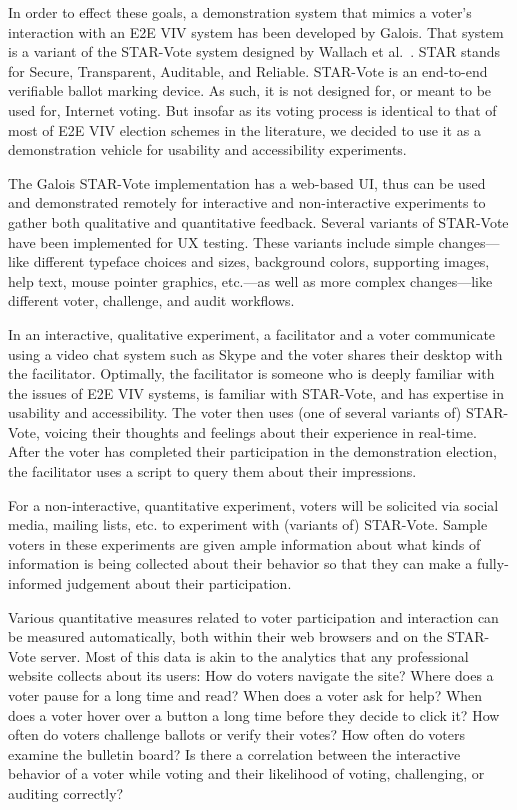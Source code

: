 In order to effect these goals, a demonstration system that mimics a
voter's interaction with an E2E VIV system has been developed by
Galois. That system is a variant of the STAR-Vote system designed by
Wallach et al.~\cite{star-vote}. STAR stands for Secure, Transparent,
Auditable, and Reliable. STAR-Vote is an end-to-end verifiable ballot
marking device. As such, it is not designed for, or meant to be used
for, Internet voting. But insofar as its voting process is identical
to that of most of E2E VIV election schemes in the literature, we
decided to use it as a demonstration vehicle for usability and
accessibility experiments.

The Galois STAR-Vote implementation has a web-based UI, thus can be
used and demonstrated remotely for interactive and non-interactive
experiments to gather both qualitative and quantitative feedback.
Several variants of STAR-Vote have been implemented for UX testing.
These variants include simple changes---like different typeface
choices and sizes, background colors, supporting images, help text,
mouse pointer graphics, etc.---as well as more complex changes---like
different voter, challenge, and audit workflows.

In an interactive, qualitative experiment, a facilitator and a voter
communicate using a video chat system such as Skype and the voter
shares their desktop with the facilitator. Optimally, the facilitator
is someone who is deeply familiar with the issues of E2E VIV systems,
is familiar with STAR-Vote, and has expertise in usability and
accessibility. The voter then uses (one of several variants of)
STAR-Vote, voicing their thoughts and feelings about their experience
in real-time. After the voter has completed their participation in the
demonstration election, the facilitator uses a script to query them
about their impressions.

For a non-interactive, quantitative experiment, voters will be
solicited via social media, mailing lists, etc. to experiment with
(variants of) STAR-Vote. Sample voters in these experiments are given
ample information about what kinds of information is being collected
about their behavior so that they can make a fully-informed judgement
about their participation.

Various quantitative measures related to voter participation and
interaction can be measured automatically, both within their web
browsers and on the STAR-Vote server. Most of this data is akin to the
analytics that any professional website collects about its users: How
do voters navigate the site?  Where does a voter pause for a long time
and read?  When does a voter ask for help?  When does a voter hover
over a button a long time before they decide to click it?  How often
do voters challenge ballots or verify their votes?  How often do
voters examine the bulletin board?  Is there a correlation between the
interactive behavior of a voter while voting and their likelihood of
voting, challenging, or auditing correctly?

